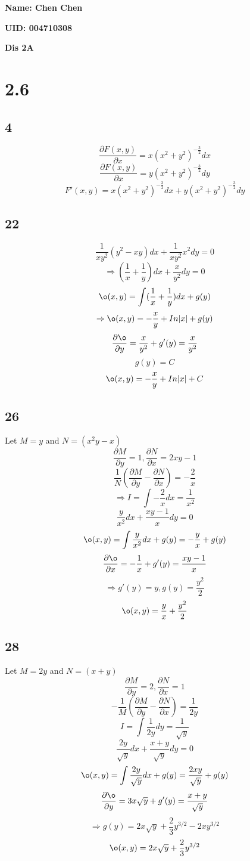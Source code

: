 \documentclass[12pt, a4paper]{IEEEtran}
\begin{document}
    \centerline{\textbf{Name: Chen Chen}}
    \centerline{\textbf{UID: 004710308}}
    \centerline{\textbf{Dis 2A}}

    \section*{2.6}

    \subsection*{4}
    $$\frac{\partial F(x,y)}{\partial x}=x(x^2+y^2)^{-\frac{3}{2}}dx$$
    $$\frac{\partial F(x,y)}{\partial x}=y(x^2+y^2)^{-\frac{3}{2}}dy$$
    $$F'(x,y)=x(x^2+y^2)^{-\frac{3}{2}}dx+y(x^2+y^2)^{-\frac{3}{2}}dy$$

    \subsection*{22}
    $$\frac{1}{xy^2}(y^2-xy)dx+\frac{1}{xy^2}x^2dy=0$$
    $$\Rightarrow (\frac{1}{x}+\frac{1}{y})dx+\frac{x}{y^2}dy=0$$
    $$\o (x,y)=\int (\frac{1}{x}+\frac{1}{y})dx+g(y)$$
    $$\Rightarrow \o(x,y)=-\frac{x}{y}+In|x|+g(y)$$
    $$\frac{\partial \o}{\partial y}=\frac{x}{y^2}+g'(y)=\frac{x}{y^2}$$
    $$g(y)=C$$
    $$\o (x,y)=-\frac{x}{y}+In|x|+C$$

    \subsection*{26}
    Let $M=y$ and $N=(x^2y-x)$
    $$\frac{\partial M}{\partial y}=1, \frac{\partial N}{\partial x}=2xy-1$$
    $$\frac{1}{N}(\frac{\partial M}{\partial y}-\frac{\partial N}{\partial x})=-\frac{2}{x}$$
    $$\Rightarrow I=\int -\frac{2}{x}dx=\frac{1}{x^2}$$
    $$\frac{y}{x^2}dx+\frac{xy-1}{x}dy=0$$
    $$\o(x,y)=\int \frac{y}{x^2}dx +g(y)=-\frac{y}{x}+g(y)$$
    $$\frac{\partial \o}{\partial x}=-\frac{1}{x}+g'(y)=\frac{xy-1}{x}
    $$
    $$\Rightarrow g'(y)=y, g(y)=\frac{y^2}{2}$$
    $$\o(x,y)=\frac{y}{x}+\frac{y^2}{2}$$
    
    \subsection*{28}
    Let $M=2y$ and $N=(x+y)$
    $$\frac{\partial M}{\partial y}=2, \frac{\partial N}{\partial x}=1$$
    $$-\frac{1}{M}(\frac{\partial M}{\partial y}-\frac{\partial N}{\partial x})=\frac{1}{2y}$$
    $$I =\int \frac{1}{2y} dy=\frac{1}{\sqrt{y}}$$
    $$\frac{2y}{\sqrt{y}}dx+\frac{x+y}{\sqrt{y}}dy=0$$
    $$\o (x,y)=\int \frac{2y}{\sqrt{y}}dx+g(y)=\frac{2xy}{\sqrt{y}}+g(y)$$
    $$\frac{\partial \o}{\partial y}=3x\sqrt{y}+g'(y)=\frac{x+y}{\sqrt{y}}$$
    $$\Rightarrow g(y)=2x\sqrt{y}+\frac{2}{3}y^{3/2}-2xy^{3/2}$$
    $$\o(x,y)=2x\sqrt{y}+\frac{2}{3}y^{3/2}$$
\end{document}
